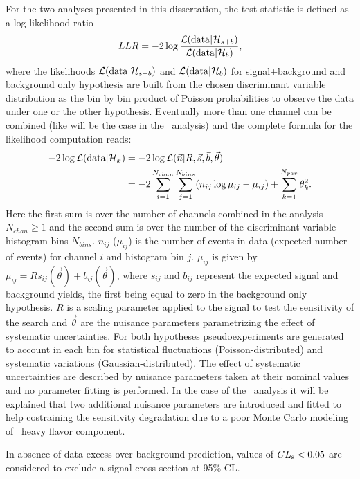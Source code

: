 For the two analyses presented in this dissertation, the test statistic
is defined as a log-likelihood ratio 
\begin{equation}\label{eq:llr}
LLR = -2\log \dfrac{\mathcal{L}({\rm data}|\mathcal{H}_{s+b})}{\mathcal{L}({\rm data}|\mathcal{H}_{b})},
\end{equation}
where the likelihoods $\mathcal{L}({\rm data}|\mathcal{H}_{s+b})$
 and $\mathcal{L}({\rm data}|\mathcal{H}_{b})$ for 
signal+background and background only hypothesis
are built from the chosen discriminant variable distribution 
as the bin by bin product of Poisson probabilities to observe the
data under one or the other hypothesis.
Eventually more than one channel can be combined (like will be
the case in the \htx\ analysis) and the complete formula for
the likelihood computation reads:
\begin{align}
-2 \log {\cal L}({\rm data}|\mathcal{H}_x) 
   & =  
   -2 \log {\cal L}(\vec{n}|R,\vec{s},\vec{b},\vec{\theta}) \notag\\
   & =  
  -2 \sum_{i=1}^{N_{chan}}\sum_{j=1}^{N_{bins}} (n_{ij}\log \mu_{ij}-\mu_{ij})+\sum_{k=1}^{N_{par}} \theta_k^2.
\end{align}
Here the first sum is over the number of channels
combined in the analysis $N_{chan}\geq 1$ and the 
second sum is over the number of the discriminant variable
histogram bins $N_{bins}$. $n_{ij}$ ($\mu_{ij}$) is the 
number of events in data (expected number of events) 
for channel $i$ and histogram bin $j$. $\mu_{ij}$ is given by
$\mu_{ij} = R s_{ij}(\vec{\theta})+ b_{ij}(\vec{\theta})$, 
where $s_{ij}$  and $b_{ij}$ represent the
expected signal and background yields, 
the first being equal to zero in the background only hypothesis.
$R$ is a scaling 
parameter applied to the signal
to test the sensitivity of the search and $\vec{\theta}$
are the nuisance parameters parametrizing the effect of
systematic uncertainties. 
For both hypotheses pseudoexperiments are generated to
account in each bin for statistical fluctuations (Poisson-distributed)
and systematic variations (Gaussian-distributed). The effect of
systematic uncertainties are described by nuisance parameters taken
at their nominal values and no parameter fitting is performed.
In the case of the \htx\ analysis it will be explained that
two additional nuisance parameters are introduced and fitted
to help costraining the sensitivity degradation due to a poor
Monte Carlo modeling of \ttbar\ heavy flavor component.

In absence of data excess over background prediction, values of
$\cls{s}<0.05$ are considered to exclude a signal cross section
at 95\% CL.

